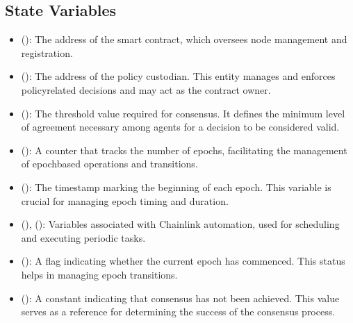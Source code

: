 \documentclass[a4paper,10pt,english]{sphinxmanual}
\begin{document}
\subsection{State Variables}
\label{\detokenize{docs_consensus_mechanism_contract:state-variables}}\begin{itemize}
\item {} 
\sphinxAtStartPar
{} ():
The address of the  smart contract, which oversees node management and registration.

\item {} 
\sphinxAtStartPar
{} ():
The address of the policy custodian. This entity manages and enforces policy\sphinxhyphen{}related decisions and may act as the contract owner.

\item {} 
\sphinxAtStartPar
{} ():
The threshold value required for consensus. It defines the minimum level of agreement necessary among agents for a decision to be considered valid.

\item {} 
\sphinxAtStartPar
{} ():
A counter that tracks the number of epochs, facilitating the management of epoch\sphinxhyphen{}based operations and transitions.

\item {} 
\sphinxAtStartPar
{} ():
The timestamp marking the beginning of each epoch. This variable is crucial for managing epoch timing and duration.

\item {} 
\sphinxAtStartPar
{} (),  ():
Variables associated with Chainlink automation, used for scheduling and executing periodic tasks.

\item {} 
\sphinxAtStartPar
{} ():
A flag indicating whether the current epoch has commenced. This status helps in managing epoch transitions.

\item {} 
\sphinxAtStartPar
{} ():
A constant indicating that consensus has not been achieved. This value serves as a reference for determining the success of the consensus process.

\end{itemize}
\end{document}
